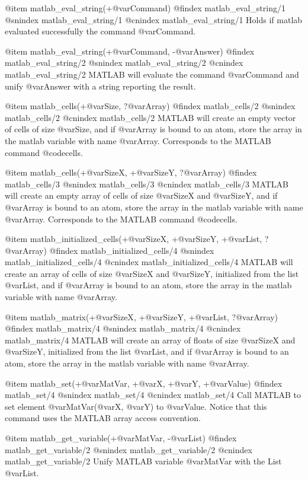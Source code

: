 {{{{{{{{@item matlab_eval_string(+@var{Command})
@findex matlab_eval_string/1
@snindex matlab_eval_string/1
@cnindex matlab_eval_string/1
Holds if matlab evaluated successfully the command @var{Command}.

@item matlab_eval_string(+@var{Command}, -@var{Answer})
@findex matlab_eval_string/2
@snindex matlab_eval_string/2
@cnindex matlab_eval_string/2
MATLAB will evaluate the command @var{Command} and unify @var{Answer}
with a string reporting the result.


@item matlab_cells(+@var{Size}, ?@var{Array})
@findex matlab_cells/2
@snindex matlab_cells/2
@cnindex matlab_cells/2
MATLAB will create an empty vector of cells of size @var{Size}, and if
@var{Array} is bound to an atom, store the array in the matlab
variable with name @var{Array}. Corresponds to the MATLAB command @code{cells}.


@item matlab_cells(+@var{SizeX}, +@var{SizeY}, ?@var{Array})
@findex matlab_cells/3
@snindex matlab_cells/3
@cnindex matlab_cells/3
MATLAB will create an empty array of cells of size @var{SizeX} and
@var{SizeY}, and if @var{Array} is bound to an atom, store the array
in the matlab variable with name @var{Array}.  Corresponds to the
MATLAB command @code{cells}.

@item matlab_initialized_cells(+@var{SizeX}, +@var{SizeY}, +@var{List}, ?@var{Array})
@findex matlab_initialized_cells/4
@snindex matlab_initialized_cells/4
@cnindex matlab_initialized_cells/4
MATLAB will create an array of cells of size @var{SizeX} and
@var{SizeY}, initialized from the list @var{List}, and if @var{Array}
is bound to an atom, store the array in the matlab variable with name
@var{Array}.

@item matlab_matrix(+@var{SizeX}, +@var{SizeY}, +@var{List}, ?@var{Array})
@findex matlab_matrix/4
@snindex matlab_matrix/4
@cnindex matlab_matrix/4
MATLAB will create an array of floats of size @var{SizeX} and @var{SizeY},
initialized from the list @var{List}, and if @var{Array} is bound to
an atom, store the array in the matlab variable with name @var{Array}.

@item matlab_set(+@var{MatVar}, +@var{X}, +@var{Y}, +@var{Value})
@findex matlab_set/4
@snindex matlab_set/4
@cnindex matlab_set/4
Call MATLAB to set element @var{MatVar}(@var{X}, @var{Y}) to
@var{Value}. Notice that this command uses the MATLAB array access
convention.

@item matlab_get_variable(+@var{MatVar}, -@var{List})
@findex matlab_get_variable/2
@snindex matlab_get_variable/2
@cnindex matlab_get_variable/2
Unify MATLAB variable @var{MatVar} with the List @var{List}.

}}}}}}}}
